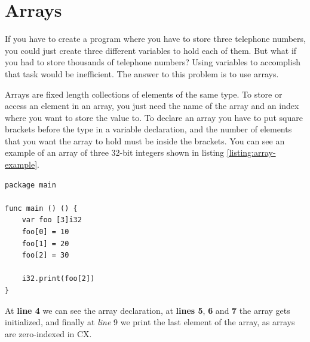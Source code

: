 \documentclass[11pt,fleqn,openany]{book} %
\begin{document}
\section{Arrays}


If you have to create a program where you have to store three telephone numbers, you could just create three different variables to hold each of them. But what if you had to store thousands of telephone numbers? Using variables to accomplish that task would be inefficient. The answer to this problem is to use arrays.

Arrays are fixed length collections of elements of the same type. To store or access an element in an array, you just need the name of the array and an index where you want to store the value to. To declare an array you have to put square brackets before the type in a variable declaration, and the number of elements that you want the array to hold must be inside the brackets. You can see an example of an array of three 32-bit integers shown in listing \ref{listing:array-example}.

\begin{lstlisting}[caption={Array example},captionpos=b,label={listing:array-example}]
package main

func main () () {
	var foo [3]i32
	foo[0] = 10
	foo[1] = 20
	foo[2] = 30

	i32.print(foo[2])
}
\end{lstlisting}

At \textbf{line 4} we can see the array declaration, at \textbf{lines 5}, \textbf{6} and \textbf{7} the array gets initialized, and finally at \textit{line} 9 we print the last element of the array, as arrays are zero-indexed in CX.
\end{document}
